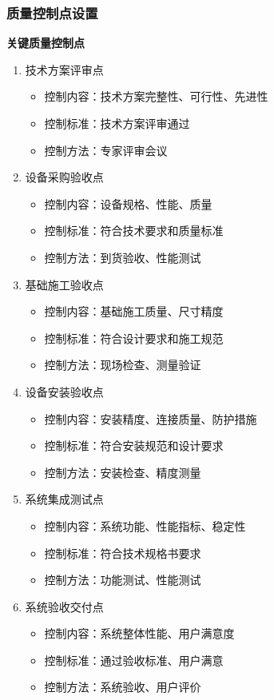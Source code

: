 \documentclass[UTF8,a4paper,12pt]{article}
\begin{document}
\subsubsection{质量控制点设置}
\textbf{关键质量控制点}
\begin{enumerate}
    \item 技术方案评审点
    \begin{itemize}
        \item 控制内容：技术方案完整性、可行性、先进性
        \item 控制标准：技术方案评审通过
        \item 控制方法：专家评审会议
    \end{itemize}
    \item 设备采购验收点
    \begin{itemize}
        \item 控制内容：设备规格、性能、质量
        \item 控制标准：符合技术要求和质量标准
        \item 控制方法：到货验收、性能测试
    \end{itemize}
    \item 基础施工验收点
    \begin{itemize}
        \item 控制内容：基础施工质量、尺寸精度
        \item 控制标准：符合设计要求和施工规范
        \item 控制方法：现场检查、测量验证
    \end{itemize}
    \item 设备安装验收点
    \begin{itemize}
        \item 控制内容：安装精度、连接质量、防护措施
        \item 控制标准：符合安装规范和设计要求
        \item 控制方法：安装检查、精度测量
    \end{itemize}
    \item 系统集成测试点
    \begin{itemize}
        \item 控制内容：系统功能、性能指标、稳定性
        \item 控制标准：符合技术规格书要求
        \item 控制方法：功能测试、性能测试
    \end{itemize}
    \item 系统验收交付点
    \begin{itemize}
        \item 控制内容：系统整体性能、用户满意度
        \item 控制标准：通过验收标准、用户满意
        \item 控制方法：系统验收、用户评价
    \end{itemize}
\end{enumerate}
\end{document}

